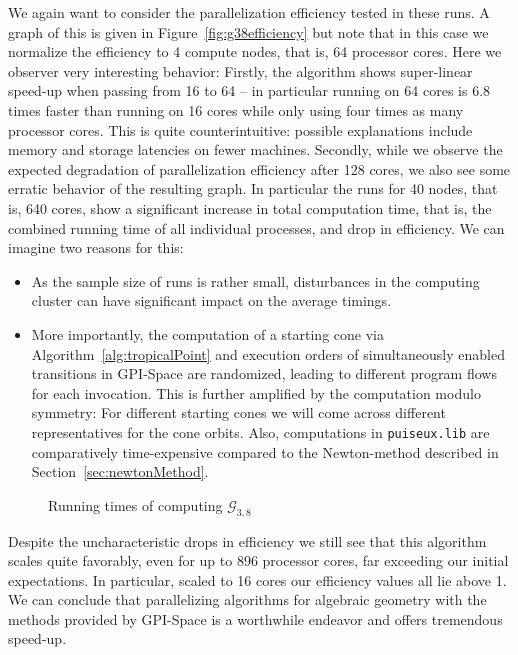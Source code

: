 \documentclass[
  paper=a4,
  titlepage,
  bibliography=totoc,
  pagesize=pdftex
]{scrartcl}
\numberwithin{figure}{section}
\numberwithin{equation}{section}
\numberwithin{table}{section}
\theoremstyle{definition}
\numberwithin{definition}{section}
\begin{document}
We again want to consider the parallelization efficiency tested in these runs. A graph of
this is given in Figure~\ref{fig:g38efficiency} but note that in this case we normalize
the efficiency to 4 compute nodes, that is, 64 processor cores. Here we observer very
interesting behavior: Firstly, the algorithm shows super-linear speed-up when passing from
16 to 64 -- in particular running on 64 cores is 6.8 times faster than running on 16 cores
while only using four times as many processor cores. This is quite counterintuitive:
possible explanations include memory and storage latencies on fewer machines.
Secondly, while we observe the expected degradation of parallelization efficiency
after 128 cores, we also see some erratic behavior of the resulting graph. In particular
the runs for 40 nodes, that is, 640 cores, show a significant increase in total
computation time, that is, the combined running time of all individual processes, and drop
in efficiency. We can imagine two reasons for this:
\begin{itemize}
  \item As the sample size of runs is rather small, disturbances in the computing cluster
    can have significant impact on the average timings.
  \item More importantly, the computation of a starting cone via
    Algorithm~\ref{alg:tropicalPoint} and execution orders of simultaneously enabled
    transitions in GPI-Space are randomized, leading to different program flows for each
    invocation. This is further amplified by the computation modulo symmetry: For
    different starting cones we will come across different representatives for the cone
    orbits. Also, computations in \texttt{puiseux.lib} are comparatively time-expensive
    compared to the Newton-method described in Section~\ref{sec:newtonMethod}.
\end{itemize}

\begin{figure}[htbp]
  \begin{center}
    
  \end{center}
  \caption{Running times of computing $\mathcal{G}_{3,8}$}
  \label{fig:g38scaling}
\end{figure}

Despite the uncharacteristic drops in efficiency we still see that this algorithm scales
quite favorably, even for up to 896 processor cores, far exceeding our initial
expectations. In particular, scaled to 16 cores our efficiency values all lie above 1.
We can conclude that parallelizing algorithms for algebraic geometry with the methods
provided by GPI-Space is a worthwhile endeavor and offers tremendous speed-up.

\clearpage
\printbibliography
\end{document}
